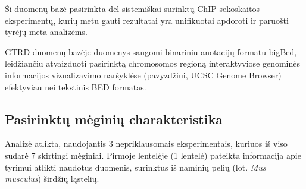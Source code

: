 \documentclass[12pt]{article}
\begin{document}
Ši duomenų bazė pasirinkta dėl sistemiškai surinktų ChIP sekoskaitos
eksperimentų, kurių metu gauti rezultatai yra unifikuotai apdoroti ir
paruošti tyrėjų meta-analizėms.

GTRD duomenų bazėje duomenys saugomi binariniu anotacijų formatu bigBed,
leidžiančiu atvaizduoti pasirinktą chromosomos regioną interaktyviose genominės
informacijos vizualizavimo naršyklėse (pavyzdžiui, UCSC Genome
Browser\cite{UCSCGB}) efektyviau nei tekstinis BED formatas.

\subsection{Pasirinktų mėginių charakteristika}
Analizė atlikta, naudojantis 3 nepriklausomais eksperimentais, kuriuos iš viso
sudarė 7 skirtingi mėginiai. Pirmoje lentelėje (1 lentelė) pateikta informacija
apie tyrimui atlikti naudotus duomenis, surinktus iš naminių pelių
(lot. \emph{Mus musculus}) širdžių ląstelių.
\end{document}
